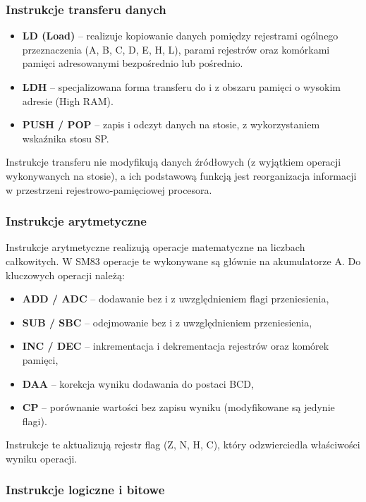 \documentclass{article}
\begin{document}
\subsubsection{Instrukcje transferu danych}

\begin{itemize}
	\item \textbf{LD (Load)} -- realizuje kopiowanie danych pomiędzy rejestrami ogólnego przeznaczenia (A, B, C, D, E, H, L), parami rejestrów oraz komórkami pamięci adresowanymi bezpośrednio lub pośrednio.
	\item \textbf{LDH} -- specjalizowana forma transferu do i z obszaru pamięci o wysokim adresie (High RAM).
	\item \textbf{PUSH / POP} -- zapis i odczyt danych na stosie, z wykorzystaniem wskaźnika stosu SP.
\end{itemize}

Instrukcje transferu nie modyfikują danych źródłowych (z wyjątkiem operacji wykonywanych na stosie), a ich podstawową funkcją jest reorganizacja informacji w przestrzeni rejestrowo-pamięciowej procesora.

\subsubsection{Instrukcje arytmetyczne}

Instrukcje arytmetyczne realizują operacje matematyczne na liczbach całkowitych. W SM83 operacje te wykonywane są głównie na akumulatorze A. Do kluczowych operacji należą:

\begin{itemize}
	\item \textbf{ADD / ADC} -- dodawanie bez i z uwzględnieniem flagi przeniesienia,
	\item \textbf{SUB / SBC} -- odejmowanie bez i z uwzględnieniem przeniesienia,
	\item \textbf{INC / DEC} -- inkrementacja i dekrementacja rejestrów oraz komórek pamięci,
	\item \textbf{DAA} -- korekcja wyniku dodawania do postaci BCD,
	\item \textbf{CP} -- porównanie wartości bez zapisu wyniku (modyfikowane są jedynie flagi).
\end{itemize}

Instrukcje te aktualizują rejestr flag (Z, N, H, C), który odzwierciedla właściwości wyniku operacji.

\subsubsection{Instrukcje logiczne i bitowe}
\end{document}
